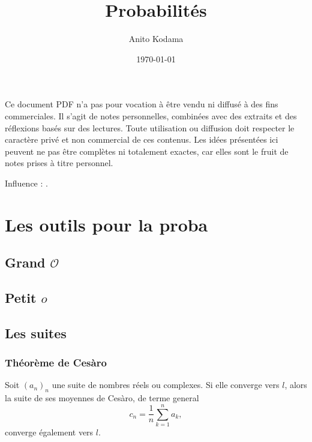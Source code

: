 
\usepackage{emoji}
\title{Probabilités}
\author{Anito Kodama}
\date{\today}


\maketitle

\begin{center}
\begin{minipage}{0.9\textwidth}
\small\ttfamily
Ce document PDF n'a pas pour vocation à être vendu ni diffusé à des fins commerciales. Il s'agit de notes personnelles, combinées avec des extraits et des réflexions basés sur des lectures. Toute utilisation ou diffusion doit respecter le caractère privé et non commercial de ces contenus. Les idées présentées ici peuvent ne pas être complètes ni totalement exactes, car elles sont le fruit de notes prises à titre personnel.

Influence : .
\end{minipage}
\end{center}


\section{Les outils pour la proba}

\subsection{Grand $\mathcal{O}$}

\subsection{Petit $o$}

\subsection{Les suites}

\subsubsection{Théorème de Cesàro}
\bp
Soit $(a_n)_n$ une suite de nombres réels ou complexes. Si elle converge vers $l$, alors la suite de ses moyennes de Cesàro, de terme general $$c_n = \frac1n \sum_{k=1}^n a_k,$$ converge également vers $l$.
\ep

\bigskip

